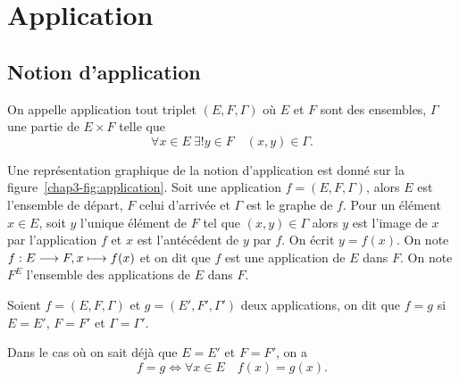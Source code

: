 \section{Application}
\label{chap3-sec:applications}
\subsection{Notion d'application}
\label{chap3-subsec:notiondapplication}
\begin{defdef}
    On appelle application tout triplet \((E, F, \Gamma)\) où \(E\) et \(F\) sont 
    des ensembles, \(\Gamma\) une partie de \(E \times F\) telle que
    \begin{equation}
        \forall x \in E \ \exists! y \in F \quad (x,y) \in \Gamma.
    \end{equation}
\end{defdef}
Une représentation graphique de la notion d'application est donné sur la 
figure~\ref{chap3-fig:application}. Soit une application \(f=(E,F,\Gamma)\), 
alors \(E\) est l'ensemble de départ, \(F\) celui d'arrivée et \(\Gamma\) est le 
graphe de \(f\).
Pour un élément \(x \in E\), soit \(y\) l'unique élément de \(F\) tel que 
\((x,y) \in \Gamma\) alors \(y\) est l'image de \(x\) par l'application \(f\) et 
\(x\) est l'antécédent de \(y\) par \(f\). On écrit \(y=f(x)\). On note 
\(f:E \longrightarrow F, x \longmapsto f(x)\) et on dit que \(f\) est une application de 
\(E\) dans \(F\). On note \(F^E\) l'ensemble des applications de \(E\) dans 
\(F\).
%
\begin{defdef}
    Soient \(f=(E,F,\Gamma)\) et \(g=(E',F',\Gamma')\) deux applications, on dit que 
    \(f=g\) si \(E=E'\), \(F=F'\) et \(\Gamma=\Gamma'\).
\end{defdef}
Dans le cas où on sait déjà que \(E=E'\) et \(F=F'\), on a
\begin{equation}
    f=g \iff \forall x \in E \quad f(x)=g(x).
\end{equation}
%
